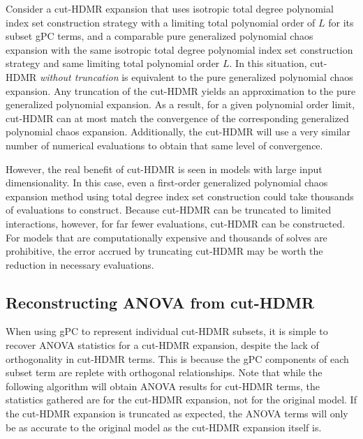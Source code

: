 Consider a cut-HDMR expansion that uses isotropic total degree polynomial index set construction strategy with
a limiting total polynomial order of $L$ for its subset gPC terms, and a comparable pure generalized polynomial
chaos expansion with the same isotropic total degree polynomial index set construction strategy and same
limiting total polynomial order $L$.  In this situation, cut-HDMR \emph{without truncation} is equivalent to
the pure generalized polynomial chaos expansion.  Any truncation of the cut-HDMR yields an approximation to
the pure generalized polynomial expansion.  As a result, for a given polynomial order limit, cut-HDMR can at
most match the convergence of the corresponding generalized polynomial chaos expansion.  Additionally, the
cut-HDMR will use a very similar number of numerical evaluations to obtain that same level of convergence.

However, the real benefit of cut-HDMR is seen in models with large input dimensionality.  In this case, even a
first-order generalized polynomial chaos expansion method using total degree index set construction could take
thousands of evaluations to construct.  Because cut-HDMR can be truncated to limited interactions, however,
for far fewer evaluations, cut-HDMR can be constructed.  For models that are computationally expensive and
thousands of solves are
prohibitive, the error accrued by truncating cut-HDMR may be worth the reduction in necessary evaluations.

\subsection{Reconstructing ANOVA from cut-HDMR}\label{sec:cut to anova}
When using gPC to represent individual cut-HDMR subsets, it is simple to recover ANOVA statistics for a
cut-HDMR expansion, despite the lack of orthogonality in cut-HDMR terms.  This is because the gPC components
of each subset term are replete with orthogonal relationships.  Note that while the following algorithm will
obtain ANOVA results for cut-HDMR terms, the statistics gathered are for the cut-HDMR expansion, not for the
original model.  If the cut-HDMR expansion is truncated as expected, the ANOVA terms will only be as accurate
to the original model as the cut-HDMR expansion itself is.

